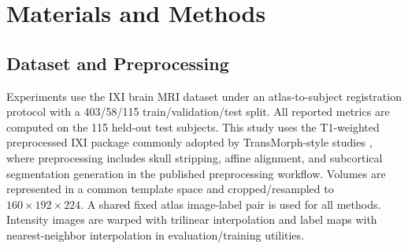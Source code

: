\documentclass[jimaging,article,submit,pdftex,moreauthors]{Definitions/mdpi}
\begin{document}
\section{Materials and Methods}

\subsection{Dataset and Preprocessing}
Experiments use the IXI brain MRI dataset \cite{ixidataset} under an atlas-to-subject registration protocol with a 403/58/115 train/validation/test split. All reported metrics are computed on the 115 held-out test subjects. This study uses the T1-weighted preprocessed IXI package commonly adopted by TransMorph-style studies \cite{chen2022transmorph,kim2021cyclemorph}, where preprocessing includes skull stripping, affine alignment, and subcortical segmentation generation in the published preprocessing workflow. Volumes are represented in a common template space and cropped/resampled to \(160 \times 192 \times 224\). A shared fixed atlas image-label pair is used for all methods. Intensity images are warped with trilinear interpolation and label maps with nearest-neighbor interpolation in evaluation/training utilities.
\end{document}
